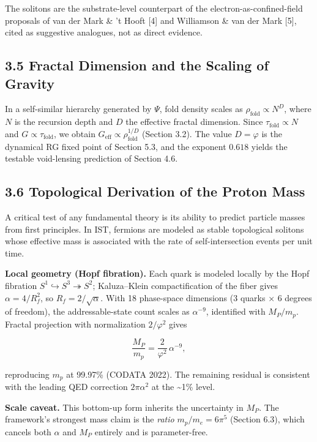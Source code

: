 \documentclass[
  11pt,
]{article}
\begin{document}
The solitons are the substrate-level counterpart of the
electron-as-confined-field proposals of van der Mark \& 't Hooft {[}4{]}
and Williamson \& van der Mark {[}5{]}, cited as suggestive analogues,
not as direct evidence.

\subsection{3.5 Fractal Dimension and the Scaling of
Gravity}\label{fractal-dimension-and-the-scaling-of-gravity}

In a self-similar hierarchy generated by \(\Psi\), fold density scales
as \(\rho_{\text{fold}} \propto N^D\), where \(N\) is the recursion
depth and \(D\) the effective fractal dimension. Since
\(\tau_{\text{fold}} \propto N\) and \(G \propto \tau_{\text{fold}}\),
we obtain \(G_{\text{eff}} \propto \rho_{\text{fold}}^{1/D}\) (Section
3.2). The value \(D = \varphi\) is the dynamical RG fixed point of
Section 5.3, and the exponent \(0.618\) yields the testable void-lensing
prediction of Section 4.6.

\subsection{3.6 Topological Derivation of the Proton
Mass}\label{topological-derivation-of-the-proton-mass}

A critical test of any fundamental theory is its ability to predict
particle masses from first principles. In IST, fermions are modeled as
stable topological solitons whose effective mass is associated with the
rate of self-intersection events per unit time.

\textbf{Local geometry (Hopf fibration).} Each quark is modeled locally
by the Hopf fibration
\(S^1 \hookrightarrow S^3 \twoheadrightarrow S^2\); Kaluza--Klein
compactification of the fiber gives \(\alpha = 4/R_f^2\), so
\(R_f = 2/\sqrt{\alpha}\). With 18 phase-space dimensions (3 quarks × 6
degrees of freedom), the addressable-state count scales as
\(\alpha^{-9}\), identified with \(M_P/m_p\). Fractal projection with
normalization \(2/\varphi^2\) gives

\[\frac{M_P}{m_p} = \frac{2}{\varphi^2}\,\alpha^{-9},\]

reproducing \(m_p\) at 99.97\% (CODATA 2022). The remaining residual is
consistent with the leading QED correction \(2\pi\alpha^2\) at the
\textasciitilde1\% level.

\textbf{Scale caveat.} This bottom-up form inherits the uncertainty in
\(M_P\). The framework's strongest mass claim is the \emph{ratio}
\(m_p/m_e = 6\pi^5\) (Section 6.3), which cancels both \(\alpha\) and
\(M_P\) entirely and is parameter-free.
\end{document}
